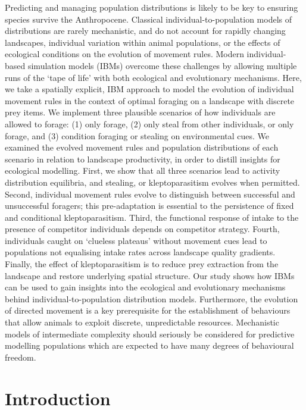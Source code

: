 \documentclass[11pt]{article}
\begin{document}
Predicting and managing population distributions is likely to be key to ensuring species survive the Anthropocene.
Classical individual-to-population models of distributions are rarely mechanistic, and do not account for rapidly changing landscapes, individual variation within animal populations, or the effects of ecological conditions on the evolution of movement rules.
Modern individual-based simulation models (IBMs) overcome these challenges by allowing multiple runs of the `tape of life' with both ecological and evolutionary mechanisms.
Here, we take a spatially explicit, IBM approach to model the evolution of individual movement rules in the context of optimal foraging on a landscape with discrete prey items.
We implement three plausible scenarios of how individuals are allowed to forage: (1) only forage, (2) only steal from other individuals, or only forage, and (3) condition foraging or stealing on environmental cues.
We examined the evolved movement rules and population distributions of each scenario in relation to landscape productivity, in order to distill insights for ecological modelling.
First, we show that all three scenarios lead to activity distribution equilibria, and stealing, or kleptoparasitism evolves when permitted. 
Second, individual movement rules evolve to distinguish between successful and unsuccessful foragers; this pre-adaptation is essential to the persistence of fixed and conditional kleptoparasitism.
Third, the functional response of intake to the presence of competitor individuals depends on competitor strategy.
Fourth, individuals caught on `clueless plateaus' without movement cues lead to populations not equalising intake rates across landscape quality gradients.
Finally, the effect of kleptoparasitism is to reduce prey extraction from the landscape and restore underlying spatial structure.
Our study shows how IBMs can be used to gain insights into the ecological and evolutionary mechanisms behind individual-to-population distribution models.
Furthermore, the evolution of directed movement is a key prerequisite for the establishment of behaviours that allow animals to exploit discrete, unpredictable resources.
Mechanistic models of intermediate complexity should seriously be considered for predictive modelling populations which are expected to have many degrees of behavioural freedom.

\section{Introduction}
\end{document}
